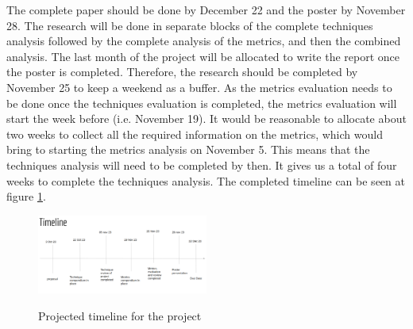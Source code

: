 \documentclass[10pt, conference]{IEEEtran}
\begin{document}
The complete paper should be done by December 22 and the poster by November 28. 
The research will be done in separate blocks of the complete techniques analysis 
followed by the complete analysis of the metrics, and then the combined analysis.
The last month of the project will be allocated to write the report once the 
poster is completed.
Therefore, the research should be completed by November 25 to keep a weekend 
as a buffer. As the metrics evaluation needs to be done once the techniques evaluation is 
completed, the metrics evaluation will start the week before (i.e. November 19).
It would be reasonable to allocate about two weeks to collect all the required 
information on the metrics, which would bring to starting the metrics analysis 
on November 5. 
This means that the techniques analysis will need to be completed by then.
It gives us a total of four weeks to complete the techniques analysis. The 
completed timeline can be seen at figure \ref{fig:timline}.

\begin{figure}[h]
  \caption{Projected timeline for the project}
  \includegraphics[width=0.5\textwidth]{timeline}
  \label{fig:timline}
\end{figure}

\balance


\end{document}
